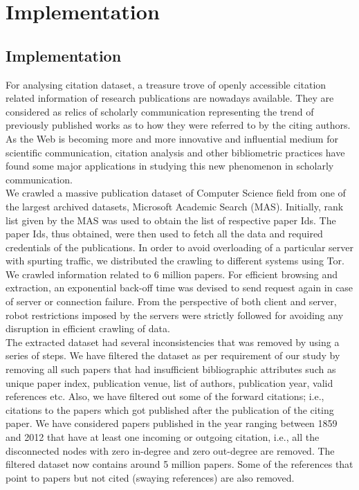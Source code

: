 \graphicspath{{Implementation/Figures/}}
\chapter{Implementation}
\section{Implementation}
\label{S:1}
For analysing citation dataset, a treasure trove of openly accessible citation related information of research publications are nowadays available. They are considered as relics of scholarly communication representing the trend of previously published works as to how they were referred to by the citing authors. As the Web is becoming more and more innovative and influential medium for scientific communication, citation analysis and other bibliometric practices have found some major applications in studying this new phenomenon in scholarly communication.\\

We crawled a massive publication dataset of Computer Science field from one of the largest archived datasets, Microsoft Academic Search (MAS). Initially, rank list given by the MAS was used to obtain the list of respective paper Ids. The paper Ids, thus obtained, were then used to fetch all the data and required credentials of the publications. In order to avoid overloading of a particular server with spurting traffic, we distributed the crawling to different systems using Tor. We crawled information related to 6 million papers. For efficient browsing and extraction, an exponential back-off time was devised to send request again in case of server or connection failure. From the perspective of both client and server, robot restrictions imposed by the servers were strictly followed for avoiding any disruption in efficient crawling of data.\\

The extracted dataset had several inconsistencies that was removed by using a series of steps. We have filtered the dataset as per requirement of our study by removing all such papers that had insufficient bibliographic attributes such as unique paper index, publication venue, list of authors, publication year, valid references etc. Also, we have filtered out some of the forward citations; i.e., citations to the papers which got published after the publication of the citing paper. We have considered papers published in the year ranging between 1859 and 2012 that have at least one incoming or outgoing citation, i.e., all the disconnected nodes with zero in-degree and zero out-degree are removed. The filtered dataset now contains around 5 million papers. Some of the references that point to papers but not cited (swaying references) are also removed.\\

